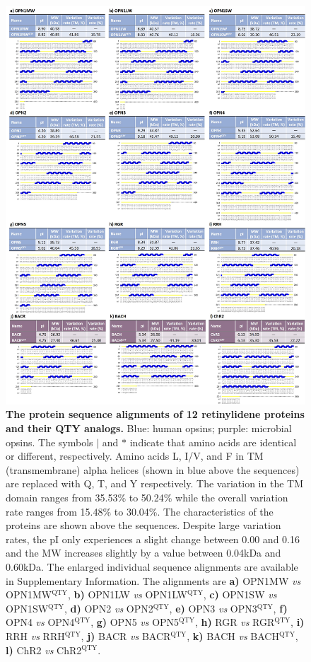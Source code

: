 \documentclass[fleqn, 10pt]{manuscript}
\begin{document}
\begin{figure}[htbp]
	\centering
	\includegraphics[width=\linewidth]{Figures/sequences.jpg}
	\caption{\textbf{The protein sequence alignments of 12 retinylidene proteins and their QTY analogs. } Blue: human opsins; purple: microbial opsins. The symbols $|$ and $*$ indicate that amino acids are identical or different, respectively. Amino acids L, I/V, and F in TM (transmembrane) alpha helices (shown in blue above the sequences) are replaced with Q, T, and Y respectively. The variation in the TM domain ranges from 35.53\% to 50.24\% while the overall variation rate ranges from 15.48\% to 30.04\%. The characteristics of the proteins are shown above the sequences. Despite large variation rates, the pI only experiences a slight change between 0.00 and 0.16 and the MW increases slightly by a value between 0.04kDa and 0.60kDa. The enlarged individual sequence alignments are available in Supplementary Information. 
    The alignments are 
    \textbf{a)} OPN1MW \textit{vs} OPN1MW$^{\textrm{QTY}}$, 
    \textbf{b)} OPN1LW \textit{vs} OPN1LW$^{\textrm{QTY}}$, 
    \textbf{c)} OPN1SW \textit{vs} OPN1SW$^{\textrm{QTY}}$, 
    \textbf{d)} OPN2 \textit{vs} OPN2$^{\textrm{QTY}}$, 
    \textbf{e)} OPN3 \textit{vs} OPN3$^{\textrm{QTY}}$, 
    \textbf{f)} OPN4 \textit{vs} OPN4$^{\textrm{QTY}}$, 
    \textbf{g)} OPN5 \textit{vs} OPN5$^{\textrm{QTY}}$, 
    \textbf{h)} RGR \textit{vs} RGR$^{\textrm{QTY}}$, 
    \textbf{i)} RRH \textit{vs} RRH$^{\textrm{QTY}}$, 
    \textbf{j)} BACR \textit{vs} BACR$^{\textrm{QTY}}$, 
    \textbf{k)} BACH \textit{vs} BACH$^{\textrm{QTY}}$, 
    \textbf{l)} ChR2 \textit{vs} ChR2$^{\textrm{QTY}}$. }
	\label{fig:sequences}
\end{figure}
\end{document}
